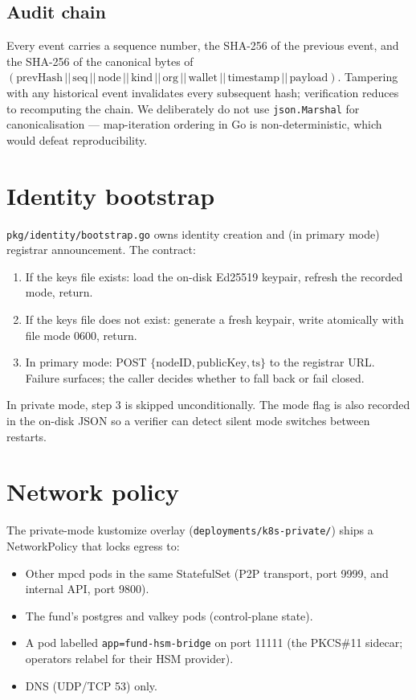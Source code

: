 \documentclass[11pt,a4paper]{article}
\begin{document}
\subsection{Audit chain}

Every event carries a sequence number, the SHA-256 of the previous
event, and the SHA-256 of the canonical bytes of $(\text{prevHash} \,||\,
\text{seq} \,||\, \text{node} \,||\, \text{kind} \,||\, \text{org} \,||\,
\text{wallet} \,||\, \text{timestamp} \,||\, \text{payload})$. Tampering
with any historical event invalidates every subsequent hash; verification
reduces to recomputing the chain. We deliberately do not use
\texttt{json.Marshal} for canonicalisation --- map-iteration ordering in
Go is non-deterministic, which would defeat reproducibility.

\section{Identity bootstrap}

\texttt{pkg/identity/bootstrap.go} owns identity creation and (in
primary mode) registrar announcement. The contract:

\begin{enumerate}
  \item If the keys file exists: load the on-disk Ed25519 keypair, refresh
        the recorded mode, return.
  \item If the keys file does not exist: generate a fresh keypair, write
        atomically with file mode 0600, return.
  \item In primary mode: POST $\{\text{nodeID}, \text{publicKey},
        \text{ts}\}$ to the registrar URL. Failure surfaces; the caller
        decides whether to fall back or fail closed.
\end{enumerate}

In private mode, step 3 is skipped unconditionally. The mode flag is
also recorded in the on-disk JSON so a verifier can detect silent mode
switches between restarts.

\section{Network policy}

The private-mode kustomize overlay
(\texttt{deployments/k8s-private/}) ships a NetworkPolicy that locks
egress to:

\begin{itemize}
  \item Other mpcd pods in the same StatefulSet (P2P transport, port
        9999, and internal API, port 9800).
  \item The fund's postgres and valkey pods (control-plane state).
  \item A pod labelled \texttt{app=fund-hsm-bridge} on port 11111
        (the PKCS\#11 sidecar; operators relabel for their HSM
        provider).
  \item DNS (UDP/TCP 53) only.
\end{itemize}
\end{document}
